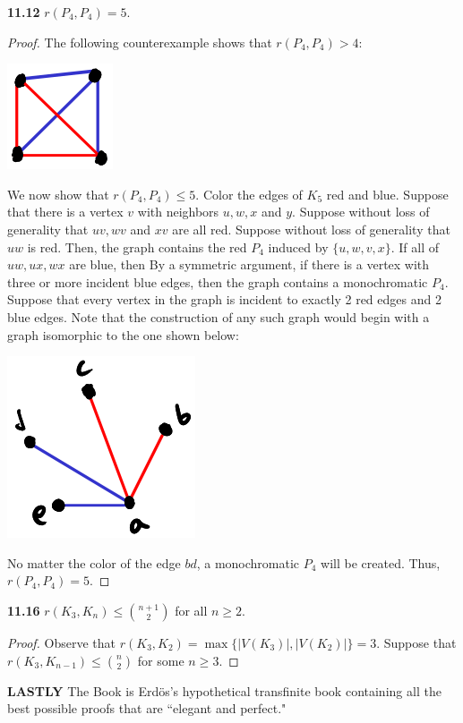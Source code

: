 \documentclass[12pt]{article}
\begin{document}
\newpage\noindent\textbf{11.12} $r(P_4, P_4) = 5$.
\begin{proof}
    The following counterexample shows that $r(P_4, P_4) > 4$:
    \begin{center} \includegraphics{8.png} \end{center}
    
        We now show that $r(P_4, P_4) \leq 5$.
        Color the edges of $K_5$ red and blue.
        Suppose that there is a vertex $v$ with neighbors $u, w, x$ and $y$.
        Suppose without loss of generality that $uv, wv$ and $xv$ are all red.
        Suppose without loss of generality that $uw$ is red.
        Then, the graph contains the red $P_4$ induced by $\{u, w, v, x\}$.
        If all of $uw, ux, wx$ are blue, then 
        By a symmetric argument, if there is a vertex with three or more incident blue edges, then the graph contains a monochromatic $P_4$.
        Suppose that every vertex in the graph is incident to exactly 2 red edges and 2 blue edges.
        Note that the construction of any such graph would begin with a graph isomorphic to the one shown below:
        \begin{center} \includegraphics[scale=.7]{9.png} \end{center}
        No matter the color of the edge $bd$, a monochromatic $P_4$ will be created.
        Thus, $r(P_4, P_4) = 5$.
\end{proof}

\newpage\noindent\textbf{11.16} $r(K_3, K_n) \leq {n+1 \choose 2}$ for all $n \geq 2$.
\begin{proof}
    Observe that $r(K_3, K_2) = \max\{|V(K_3)|, |V(K_2)|\} = 3$.
    Suppose that $r(K_3, K_{n-1}) \leq {n \choose 2}$ for some $n \geq 3$.
    

\end{proof}

\newpage\noindent\textbf{LASTLY} The Book is Erdös's hypothetical transfinite book containing all the best possible proofs that are ``elegant and perfect."
\end{document}

